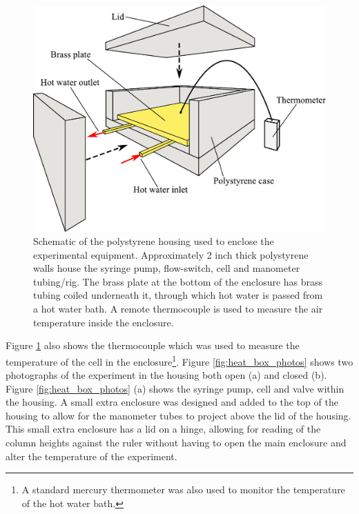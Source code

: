 \begin{figure}
\begin{center}
\includegraphics{Figures/Diode/heat_box_perspective}
\end{center}
\caption[Schematic diagram of housing for temperature controlled experiment]{\label{fig:heat_box_perspective}Schematic of the polystyrene housing used to enclose the experimental equipment. Approximately 2 inch thick polystyrene walls house the syringe pump, flow-switch, cell and manometer tubing/rig. The brass plate at the bottom of the enclosure has brass tubing coiled underneath it, through which hot water is passed from a hot water bath. A remote thermocouple is used to measure the air temperature inside the enclosure.}
\end{figure}

Figure \ref{fig:heat_box_perspective} also shows the thermocouple which was used to measure the temperature of the cell in the enclosure\footnote{A standard mercury thermometer was also used to monitor the temperature of the hot water bath.}. Figure \ref{fig:heat_box_photos} shows two photographs of the experiment in the housing both open (a) and closed (b). Figure \ref{fig:heat_box_photos} (a) shows the syringe pump, cell and valve within the housing. A small extra enclosure was designed and added to the top of the housing to allow for the manometer tubes to project above the lid of the housing. This small extra enclosure has a lid on a hinge, allowing for reading of the column heights against the ruler without having to open the main enclosure and alter the temperature of the experiment.

